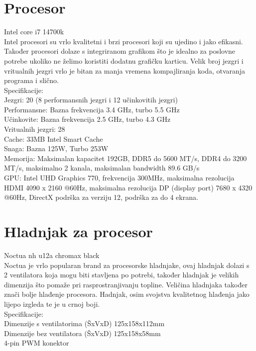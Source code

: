 \documentclass{report}
\begin{document}
\chapter{Procesor}
 Intel core i7 14700k
\\Intel procesori su vrlo kvalitetni i brzi procesori koji su ujedino i jako efikasni. Također procesori dolaze s integriranom grafikom što je idealno za poslovne potrebe ukoliko ne želimo koristiti dodatnu grafičku karticu. Velik broj jezgri i vritualnih jezgri vrlo je bitan za manja vremena kompajliranja koda, otvaranja programa i slično.
\\Specifikacije:
\\Jezgri: 20 (8 performansnih jezgri i 12 učinkovitih jezgri)
\\Performansne: Bazna frekvencija 3.4 GHz, turbo 5.5 GHz
\\Učinkovite: Bazna frekvencija 2.5 GHz, turbo 4.3 GHz
\\Vritualnih jezgri: 28
\\Cache: 33MB Intel Smart Cache
\\Snaga: Bazna 125W, Turbo 253W
\\Memorija: Maksimalan kapacitet 192GB, DDR5 do 5600 MT/s, DDR4 do 3200 MT/s, maksimalno 2 kanala, maksimalan bandwidth 89.6 GB/s
\\GPU: Intel UHD Graphics 770, frekvencija 300MHz, maksimalna rezolucija HDMI 4090 x 2160 @60Hz, maksimalna rezolucija DP (display port) 7680 x 4320 @60Hz, DirectX podrška za verziju 12, podrška za do 4 ekrana.



\chapter{Hladnjak za procesor}
Noctua nh u12a chromax black
\\Noctua je vrlo popularan brand za procesorske hladnjake, ovaj hladnjak dolazi s 2 ventilatora koja mogu biti stavljena po potrebi, također hladnjak je velikih dimenzija što pomaže pri rasprostranjivanju topline. Veličina hladnjaka također znači bolje hlađenje procesora. Hadnjak, osim svojstva kvalitetnog hlađenja jako lijepo izgleda te je u crnoj boji.
\\Specifikacije:
\\Dimenzije s ventilatorima (ŠxVxD) 125x158x112mm
\\Dimenzije bez ventilatora (ŠxVxD) 125x158x58mm
\\4-pin PWM konektor
\end{document}
